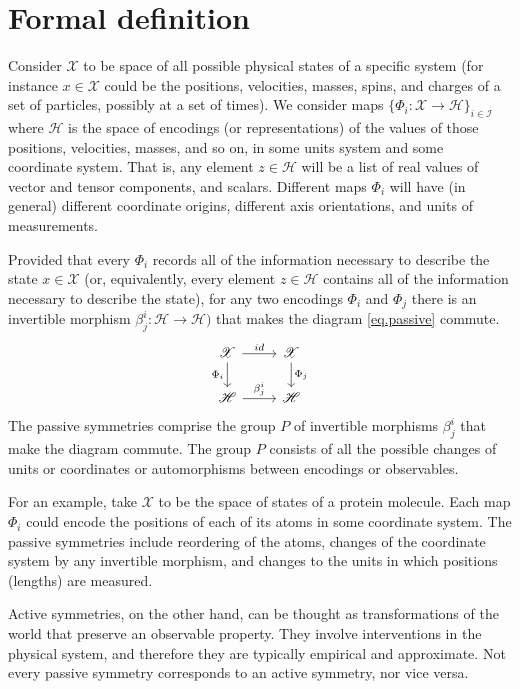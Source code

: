 \documentclass[preprint]{article} %
\renewcommand{\mathcal}[1]{\mathscr{#1}} %
\begin{document}
\section{Formal definition}\label{sec:definitions}
Consider $\mathcal{X}$ to be space of all possible physical states of a specific system (for instance $x\in \mathcal X$ could be the positions, velocities, masses, spins, and charges of a set of particles, possibly at a set of times). 
We consider maps $\{\Phi_i: \mathcal{X} \to \mathcal{H}\}_{i\in \mathcal{I}}$ where $\mathcal{H}$ is the space of encodings (or representations) of the values of those positions, velocities, masses, and so on, in some units system and some coordinate system.
That is, any element $z\in \mathcal{H}$ will be a list of real values of vector and tensor components, and scalars.
Different maps $\Phi_i$ will have (in general) different coordinate origins, different axis orientations, and units of measurements.

Provided that every $\Phi_i$ records all of the information necessary to describe the state $x\in \mathcal{X}$ (or, equivalently, every element $z\in \mathcal{H}$ contains all of the information necessary to describe the state),
for any two encodings $\Phi_i$ and $\Phi_j$ there is an invertible morphism $\beta_j^i:\mathcal{H}\to\mathcal{H})$ that makes the diagram \eqref{eq.passive} commute.
\begin{equation}\label{eq.passive}
\begin{tikzcd}[every label/.append ]
  {\mathcal{X}}\arrow[r, "id"] \arrow[d,"\Phi_i",swap] & {\mathcal{X}}  \arrow[d,"\Phi_j"]\\
{\mathcal{H}} \arrow[r, "\beta_j^i"]  & {\mathcal{H}} 
\end{tikzcd}
\end{equation}
The passive symmetries comprise the group $P$ of invertible morphisms $\beta_j^i$ that make the diagram commute.
The group $P$ consists of all the possible changes of units or coordinates or automorphisms between encodings or observables. 

For an example, take $\mathcal{X}$ to be the space of states of a protein molecule.
Each map $\Phi_i$ could encode the positions of each of its atoms in some coordinate system.
The passive symmetries include reordering of the atoms, changes of the coordinate system by any invertible morphism, and changes to the units in which positions (lengths) are measured.

Active symmetries, on the other hand, can be thought as transformations of the world that preserve an observable property.
They involve interventions in the physical system, and therefore they are typically empirical and approximate.
Not every passive symmetry corresponds to an active symmetry, nor vice versa.
\end{document}
